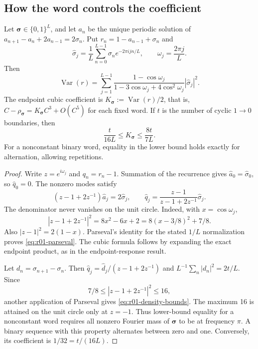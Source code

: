 \subsection{How the word controls the coefficient}
\begin{proposition}
\label{prop:r01-frequency}
Let $\bm\sigma\in\{0,1\}^L$, and let $a_n$ be the unique periodic
solution of $a_{n+1}-a_n+2a_{n-1}=2\sigma_n$. Put
$r_n=1-a_{n-1}+\sigma_n$ and
\[
 \widehat\sigma_j=\frac1L\sum_{n=0}^{L-1}\sigma_n e^{-2\pi ijn/L},
 \qquad \omega_j=\frac{2\pi j}{L}.
\]
Then
\begin{equation}\label{eq:r01-parseval}
 \operatorname{Var}(r)=
 \sum_{j=1}^{L-1}
 \frac{1-\cos\omega_j}{1-3\cos\omega_j+4\cos^2\omega_j}
 |\widehat\sigma_j|^2.
\end{equation}
The endpoint cubic coefficient is
$K_{\bm\sigma}:=\operatorname{Var}(r)/2$, that is,
$C-\rho_{\bm\sigma}=K_{\bm\sigma}C^3+O(C^5)$ for each fixed word.
If $t$ is the number of cyclic $1\to0$ boundaries, then
\begin{equation}\label{eq:r01-density-bounds}
 \frac{t}{16L}\le K_{\bm\sigma}\le\frac{8t}{7L}.
\end{equation}
For a nonconstant binary word, equality in the lower bound holds exactly
for alternation, allowing repetitions.
\end{proposition}
\begin{proof}
Write $z=e^{i\omega_j}$ and $q_n=r_n-1$. Summation of the recurrence
gives $\widehat a_0=\widehat\sigma_0$, so $\widehat q_0=0$.
The nonzero modes satisfy
\[
 (z-1+2z^{-1})\widehat a_j=2\widehat\sigma_j,
 \qquad
 \widehat q_j=\frac{z-1}{z-1+2z^{-1}}\widehat\sigma_j.
\]
The denominator never vanishes on the unit circle. Indeed, with
$x=\cos\omega_j$,
\[
 |z-1+2z^{-1}|^2=8x^2-6x+2
 =8(x-3/8)^2+7/8.
\]
Also $|z-1|^2=2(1-x)$. Parseval's identity for the stated $1/L$
normalization proves \eqref{eq:r01-parseval}. The cubic formula follows
by expanding the exact endpoint product, as in the endpoint-response result.

Let $d_n=\sigma_{n+1}-\sigma_n$. Then
$\widehat q_j=\widehat d_j/(z-1+2z^{-1})$ and
$L^{-1}\sum_n|d_n|^2=2t/L$. Since
\[
 7/8\le |z-1+2z^{-1}|^2\le16,
\]
another application of Parseval gives \eqref{eq:r01-density-bounds}.
The maximum 16 is attained on the unit circle only at $z=-1$.
Thus lower-bound equality for a nonconstant word requires all nonzero
Fourier mass of $\bm\sigma$ to be at frequency $\pi$.
A binary sequence with this property alternates between zero and one.
Conversely, its coefficient is $1/32=t/(16L)$.
\end{proof}

